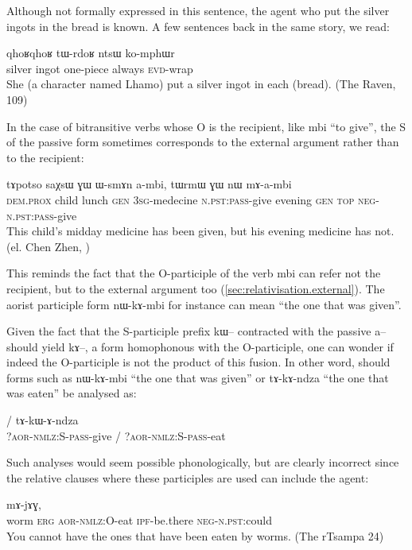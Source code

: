 \documentclass[oldfontcommands,oneside,a4paper,11pt]{memoir}
\newcommand{\ipa}[1]{{\phon #1}} %
\newcommand{\wav}[1]{}%
\newcommand{\aor}{\textsc{aor}}
\newcommand{\dem}{\textsc{dem}}
\newcommand{\erg}{\textsc{erg}}
\newcommand{\evd}{\textsc{evd}}
\newcommand{\gen}{\textsc{gen}}
\newcommand{\ipf}{\textsc{ipf}}
\newcommand{\negat}{\textsc{neg}}
\newcommand{\nmlz}{\textsc{nmlz}}
\newcommand{\npst}{\textsc{n.pst}}
\newcommand{\pass}{\textsc{pass}}
\newcommand{\sg}{\textsc{sg}}
\newcommand{\topic}{\textsc{top}}
\begin{document}
Although not formally expressed in this sentence, the agent who put the silver ingots in the bread is known. A few sentences back in the same story, we read:
\begin{exe}
\ex
\gll  	\ipa{rŋɯl} 	\ipa{qhoʁqhoʁ} 	\ipa{tɯ-rdoʁ} 	\ipa{ntsɯ} 	\ipa{ko-mphɯr}  \\
silver	ingot		one-piece	always	\evd{}-wrap  \\
 \glt   She (a character named Lhamo) put a silver ingot in each (bread). (The Raven, 109)
\end{exe} 


In the case of bitransitive verbs whose O is the recipient, like \ipa{mbi} ``to give'', the S of the passive form sometimes corresponds to the external argument rather than to the recipient:

\begin{exe}
\ex
\gll  \ipa{ki} 	\ipa{tɤpotso} 	\ipa{saχsɯ} 	\ipa{ɣɯ} 	\ipa{ɯ-smɤn} 	\ipa{a-mbi,} 	\ipa{tɯrmɯ} 	\ipa{ɣɯ} 	\ipa{nɯ} 	\ipa{mɤ-a-mbi}     \\
 \dem{}.\textsc{prox} child lunch \gen{} 3\sg{}-medecine  \npst{}:\pass{}-give evening \gen{} \topic{} \negat{}-\npst{}:\pass{}-give\\
 \glt     This child's midday medicine has been given, but his evening medicine has not. (el. Chen Zhen, \wav{8_ambi})
\end{exe} 
 
 This reminds the fact that the O-participle of the verb \ipa{mbi} can refer not the recipient, but to the external argument too (\ref{sec:relativisation.external}). The aorist participle form  \ipa{nɯ-kɤ-mbi} for instance can mean ``the one that was given''. 
 
 
 Given the fact that the S-participle prefix \ipa{kɯ}-- contracted with the passive \ipa{a}-- should yield \ipa{kɤ}--, a form homophonous with the O-participle, one can wonder if indeed the O-participle is not the product of this fusion. In other word, should  forms such as \ipa{nɯ-kɤ-mbi} ``the one that was given'' or \ipa{tɤ-kɤ-ndza} ``the one that was eaten'' be analysed as:
 
  \begin{exe}
\ex
\gll      \ipa{nɯ-kɯ-ɤ-mbi} / \ipa{tɤ-kɯ-ɤ-ndza}  \\
?\aor{}-\nmlz{}:S-\pass{}-give  / ?\aor{}-\nmlz{}:S-\pass{}-eat\\
\end{exe} 
 
Such analyses would seem possible phonologically, but are clearly incorrect since the relative clauses where these participles are used can include the agent:
 \begin{exe}
\ex
\gll      [\ipa{qajɯ} 	\ipa{kɯ} 	\ipa{tɤ-kɤ-ndza}] 	\ipa{pjɯ-tu} 	\ipa{mɤ-jɤɣ,}   \\
worm \erg{} \aor{}-\nmlz{}:O-eat \ipf{}-be.there \negat{}-\npst{}:could  \\
 \glt You cannot have the ones that have been eaten by worms.    (The rTsampa 24)
\end{exe} 
  
\end{document}
